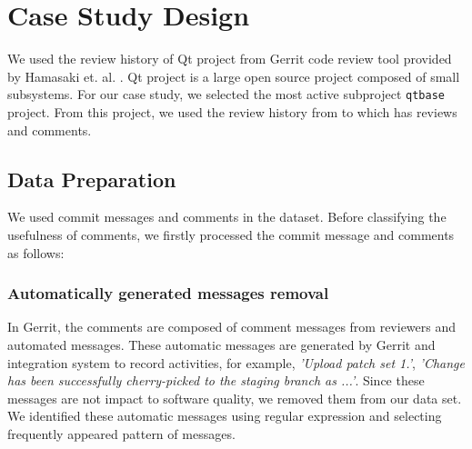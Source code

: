 
\section{Case Study Design}


We used the review history of Qt project from Gerrit code review tool provided by Hamasaki et. al. \cite{Hamasaki2013}. Qt project is a large open source project composed of small subsystems. For our case study, we selected the most active subproject \texttt{qtbase} project. From this project, we used the review history from  to  which has  reviews and  comments.




%



\subsection{Data Preparation}
We used commit messages and comments in the dataset. Before classifying the usefulness of comments, we firstly processed the commit message and comments as follows: 

\subsubsection{Automatically generated messages removal}
In Gerrit, the comments are composed of comment messages from reviewers and automated messages. These automatic messages are generated by Gerrit and integration system to record activities, for example, \textit{'Upload patch set 1.'}, \textit{'Change has been successfully cherry-picked to the staging branch as ...'}. Since these messages are not impact to software quality\cite{Mcintosh}, we removed them from our data set. We identified these automatic messages using regular expression and selecting frequently appeared pattern of messages.  



